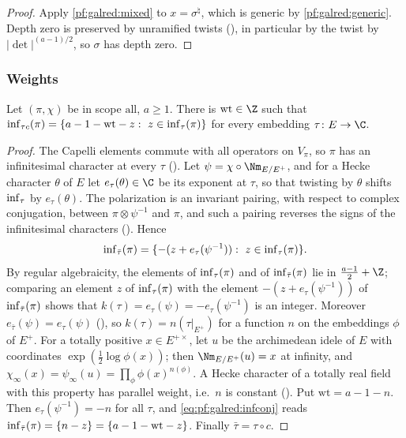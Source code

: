 \begin{proof}
Apply \cref{pf:galred:mixed} to $x=\sigma^\natural$, which is generic by \cref{pf:galred:generic}. Depth zero is
preserved by unramified twists (), in particular by the twist by
$|\det|^{(a-1)/2}$, so $\sigma$ has depth zero.
\end{proof}

\subsubsection{Weights}

\begin{lemma}\label{pf:galred:isweight}
Let $(\pi,\chi)$ be in scope $\mathrm{all}$, $a\ge1$. There is $\mathrm{wt}\in\Z$ such that
$\operatorname{inf}_{\tau c}(\pi)=\{a-1-\mathrm{wt}-z:\ z\in\operatorname{inf}_\tau(\pi)\}$ for every embedding $\tau\colon E\to\C$.
\end{lemma}

\begin{proof}
The Capelli elements commute with all operators on $V_\pi$, so $\pi$ has an infinitesimal character at every $\tau$
(). Let $\psi=\chi\circ\Nm_{E/E^+}$, and for a Hecke
character $\theta$ of $E$ let $e_\tau(\theta)\in\C$ be its exponent at $\tau$, so that twisting by $\theta$ shifts
$\operatorname{inf}_\tau$ by $e_\tau(\theta)$. The polarization is an invariant pairing, with respect to complex conjugation,
between $\pi\otimes\psi^{-1}$ and $\pi$, and such a pairing reverses the signs of the infinitesimal characters
(). Hence
\begin{equation}\label{eq:pf:galred:infconj}
  \galredinf_{\bar\tau}(\pi)=\{-(z+e_\tau(\psi^{-1})):\ z\in\galredinf_\tau(\pi)\}.
\end{equation}
By regular algebraicity, the elements of $\operatorname{inf}_\tau(\pi)$ and of $\operatorname{inf}_{\bar\tau}(\pi)$ lie in
$\frac{a-1}2+\Z$; comparing an element $z$ of $\operatorname{inf}_\tau(\pi)$ with the element $-(z+e_\tau(\psi^{-1}))$ of
$\operatorname{inf}_{\bar\tau}(\pi)$ shows that $k(\tau)=e_\tau(\psi)=-e_\tau(\psi^{-1})$ is an integer. Moreover
$e_{\bar\tau}(\psi)=e_\tau(\psi)$ (), so
$k(\tau)=n(\tau|_{E^+})$ for a function $n$ on the embeddings $\phi$ of $E^+$. For a totally positive $x\in E^{+\times}$,
let $u$ be the archimedean idele of $E$ with coordinates $\exp(\frac12\log\phi(x))$; then $\Nm_{E/E^+}(u)=x$ at
infinity, and $\chi_\infty(x)=\psi_\infty(u)=\prod_\phi\phi(x)^{n(\phi)}$. A Hecke character of a totally real field with
this property has parallel weight, i.e.\ $n$ is constant (). Put
$\mathrm{wt}=a-1-n$. Then $e_\tau(\psi^{-1})=-n$ for all $\tau$, and \eqref{eq:pf:galred:infconj} reads
$\operatorname{inf}_{\bar\tau}(\pi)=\{n-z\}=\{a-1-\mathrm{wt}-z\}$. Finally $\bar\tau=\tau\circ c$.
\end{proof}

